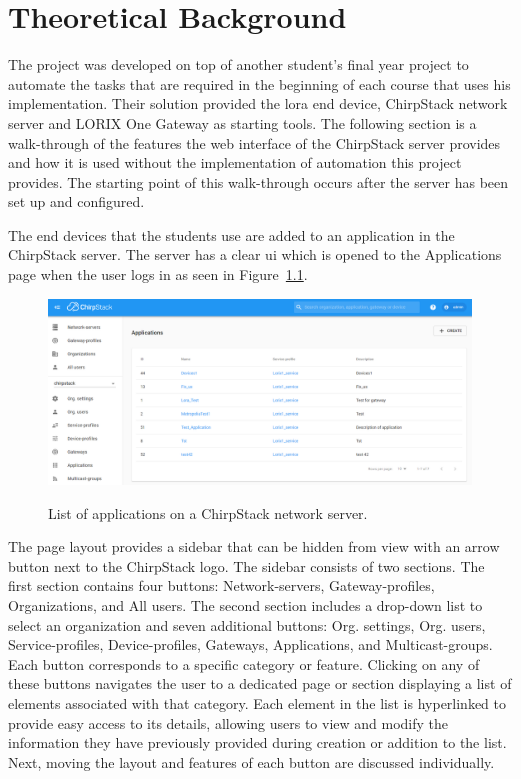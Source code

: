 
\chapter{Theoretical Background} \label{ch:theor_backgr}

The project was developed on top of another student's final year project \cite{theseus:gere-zoltan} to automate the tasks that are required in the beginning of each course that uses his implementation.
Their solution provided the \gls{lora} end device, ChirpStack network server and LORIX One Gateway as starting tools.
The following section is a walk-through of the features the web interface of the ChirpStack server provides and how it is used without the implementation of automation this project provides.
The starting point of this walk-through occurs after the server has been set up and configured.

The end devices that the students use are added to an application in the ChirpStack server.
The server has a clear \gls{ui} which is opened to the Applications page when the user logs in as seen in Figure~\ref{fig:ChirpStack_application_list}.

\begin{figure}[ht]
  \centering
  {\includegraphics[width=\textwidth]{illustration/ChirpStack_application_list.png}}
  \caption{List of applications on a ChirpStack network server.}
  \label{fig:ChirpStack_application_list}
\end{figure}

The page layout provides a sidebar that can be hidden from view with an arrow button next to the ChirpStack logo.
The sidebar consists of two sections.
The first section contains four buttons: Network-servers, Gateway-profiles, Organizations, and All users.
The second section includes a drop-down list to select an organization and seven additional buttons: Org. settings, Org. users, Service-profiles, Device-profiles, Gateways, Applications, and Multicast-groups.
Each button corresponds to a specific category or feature.
Clicking on any of these buttons navigates the user to a dedicated page or section displaying a list of elements associated with that category.
Each element in the list is hyperlinked to provide easy access to its details, allowing users to view and modify the information they have previously provided during creation or addition to the list.
Next, moving the layout and features of each button are discussed individually.

